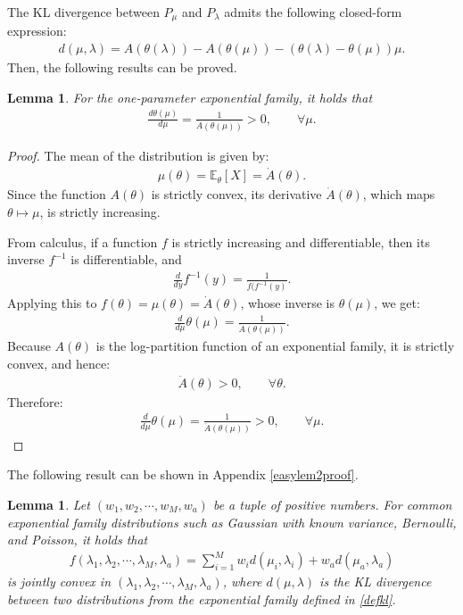 \documentclass[final]{IEEEtran}
\newcommand{\bbE}{\mathbb{E}}
\newtheorem{lemma}[theorem]{Lemma}
\begin{document}
The KL divergence between \( P_{\mu} \) and \( P_{\lambda} \) admits the following closed-form expression:
\begin{align}
d(\mu, \lambda) = A(\theta(\lambda)) - A(\theta(\mu)) - (\theta(\lambda) - \theta(\mu)) \mu \label{defkl}.
\end{align}
Then, the following results can be proved.

\begin{lemma} \label{easy:lem1} For the one-parameter exponential family, it holds that
\begin{align}
\frac{d\theta(\mu)}{d\mu}=\frac{1}{\ddot{A}(\theta(\mu))}>0, \qquad \forall \mu. 
\end{align}
\end{lemma}
\begin{proof}
The mean of the distribution is given by:
\begin{align}
\mu(\theta)=\bbE_{\theta}[X]=\dot{A}(\theta). 
\end{align}
Since the function $A(\theta)$ is strictly convex, its derivative $\dot{A}(\theta)$, which maps $\theta \mapsto \mu$, is strictly increasing. 

From calculus, if a function $f$ is strictly increasing and differentiable, then its inverse $f^{-1}$ is differentiable, and
\begin{align}
\frac{d}{dy}f^{-1}(y)=\frac{1}{\dot{f}(f^{-1}(y)}.
\end{align}
Applying this to $f(\theta)=\mu(\theta)=\dot{A}(\theta)$, whose inverse is $\theta(\mu)$, we get:
\begin{align}
\frac{d}{d\mu}\theta(\mu)=\frac{1}{\ddot{A}(\theta(\mu))}.
\end{align}
Because $A(\theta)$ is the log-partition function of an exponential family, it is strictly convex, and hence:
\begin{align}
\ddot{A}(\theta)>0, \qquad \forall \theta.
\end{align}
Therefore: 
\begin{align}
\frac{d}{d\mu}\theta(\mu)=\frac{1}{\ddot{A}(\theta(\mu))}>0, \qquad \forall \mu. 
\end{align}
\end{proof}
The following result can be shown in Appendix \ref{easylem2proof}. 
\begin{lemma}\label{easy:lem2} Let $(w_1,w_2,\cdots,w_M, w_a)$ be a tuple of positive numbers. For common exponential family distributions such as Gaussian with known variance, Bernoulli, and Poisson, it holds that
\begin{align*}
f(\lambda_1,\lambda_2,\cdots, \lambda_M, \lambda_a)=\sum_{i=1}^M w_i d(\mu_i,\lambda_i)+w_a d(\mu_a,\lambda_a)
\end{align*} is jointly convex in $(\lambda_1,\lambda_2,\cdots, \lambda_M, \lambda_a)$, where $d(\mu,\lambda)$ is the KL divergence between two distributions from the exponential family defined in \eqref{defkl}.  
\end{lemma}
\end{document}
